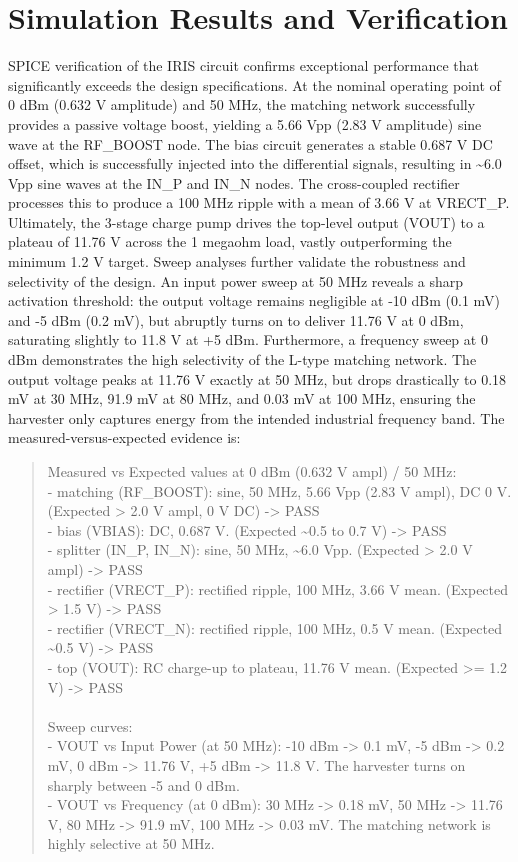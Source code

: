 \documentclass{ieeeaccess}
\begin{document}
\section{Simulation Results and Verification}
SPICE verification of the IRIS circuit confirms exceptional performance that significantly exceeds the design specifications. At the nominal operating point of 0 dBm (0.632 V amplitude) and 50 MHz, the matching network successfully provides a passive voltage boost, yielding a 5.66 Vpp (2.83 V amplitude) sine wave at the RF\_BOOST node. The bias circuit generates a stable 0.687 V DC offset, which is successfully injected into the differential signals, resulting in \textasciitilde{}6.0 Vpp sine waves at the IN\_P and IN\_N nodes. The cross-coupled rectifier processes this to produce a 100 MHz ripple with a mean of 3.66 V at VRECT\_P. Ultimately, the 3-stage charge pump drives the top-level output (VOUT) to a plateau of 11.76 V across the 1 megaohm load, vastly outperforming the minimum 1.2 V target.
Sweep analyses further validate the robustness and selectivity of the design. An input power sweep at 50 MHz reveals a sharp activation threshold: the output voltage remains negligible at -10 dBm (0.1 mV) and -5 dBm (0.2 mV), but abruptly turns on to deliver 11.76 V at 0 dBm, saturating slightly to 11.8 V at +5 dBm. Furthermore, a frequency sweep at 0 dBm demonstrates the high selectivity of the L-type matching network. The output voltage peaks at 11.76 V exactly at 50 MHz, but drops drastically to 0.18 mV at 30 MHz, 91.9 mV at 80 MHz, and 0.03 mV at 100 MHz, ensuring the harvester only captures energy from the intended industrial frequency band.
The measured-versus-expected evidence is:
\begin{quote}\ttfamily\footnotesize
Measured vs Expected values at 0 dBm (0.632 V ampl) / 50 MHz:\\
- matching (RF\_BOOST): sine, 50 MHz, 5.66 Vpp (2.83 V ampl), DC 0 V. (Expected > 2.0 V ampl, 0 V DC) -> PASS\\
- bias (VBIAS): DC, 0.687 V. (Expected \textasciitilde{}0.5 to 0.7 V) -> PASS\\
- splitter (IN\_P, IN\_N): sine, 50 MHz, \textasciitilde{}6.0 Vpp. (Expected > 2.0 V ampl) -> PASS\\
- rectifier (VRECT\_P): rectified ripple, 100 MHz, 3.66 V mean. (Expected > 1.5 V) -> PASS\\
- rectifier (VRECT\_N): rectified ripple, 100 MHz, 0.5 V mean. (Expected \textasciitilde{}0.5 V) -> PASS\\
- top (VOUT): RC charge-up to plateau, 11.76 V mean. (Expected >= 1.2 V) -> PASS\\
\\
Sweep curves:\\
- VOUT vs Input Power (at 50 MHz): -10 dBm -> 0.1 mV, -5 dBm -> 0.2 mV, 0 dBm -> 11.76 V, +5 dBm -> 11.8 V. The harvester turns on sharply between -5 and 0 dBm.\\
- VOUT vs Frequency (at 0 dBm): 30 MHz -> 0.18 mV, 50 MHz -> 11.76 V, 80 MHz -> 91.9 mV, 100 MHz -> 0.03 mV. The matching network is highly selective at 50 MHz.
\end{quote}
\end{document}
